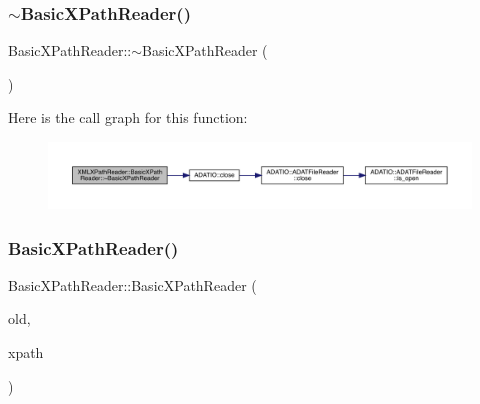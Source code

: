 \subsubsection{\texorpdfstring{$\sim$BasicXPathReader()}{~BasicXPathReader()}\hspace{0.1cm}{\footnotesize\ttfamily [1/3]}}
{\footnotesize\ttfamily Basic\+X\+Path\+Reader\+::$\sim$\+Basic\+X\+Path\+Reader (\begin{DoxyParamCaption}\item[{void}]{ }\end{DoxyParamCaption})}

Here is the call graph for this function\+:\nopagebreak
\begin{figure}[H]
\begin{center}
\leavevmode
\includegraphics[width=350pt]{d6/dbf/classXMLXPathReader_1_1BasicXPathReader_ad741466e0f48892e36f19472db5abf52_cgraph}
\end{center}
\end{figure}
\mbox{\label{classXMLXPathReader_1_1BasicXPathReader_ae0a95bb52d6b3691662663070f77f47f}} 
\subsubsection{\texorpdfstring{BasicXPathReader()}{BasicXPathReader()}\hspace{0.1cm}{\footnotesize\ttfamily [4/12]}}
{\footnotesize\ttfamily Basic\+X\+Path\+Reader\+::\+Basic\+X\+Path\+Reader (\begin{DoxyParamCaption}\item[{\mbox{\hyperlink{classXMLXPathReader_1_1BasicXPathReader}{Basic\+X\+Path\+Reader}} \&}]{old,  }\item[{const std\+::string \&}]{xpath }\end{DoxyParamCaption})}

\mbox{\label{classXMLXPathReader_1_1BasicXPathReader_aeb14ab4d5064a3d2f5e0be7b41da1ab4}} 
